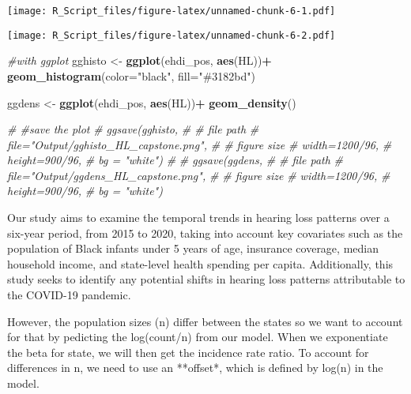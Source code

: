 \documentclass[
]{article}
\newenvironment{Shaded}{\begin{snugshade}}{\end{snugshade}}
\newcommand{\AttributeTok}[1]{\textcolor[rgb]{0.13,0.29,0.53}{#1}}
\newcommand{\CommentTok}[1]{\textcolor[rgb]{0.56,0.35,0.01}{\textit{#1}}}
\newcommand{\FunctionTok}[1]{\textcolor[rgb]{0.13,0.29,0.53}{\textbf{#1}}}
\newcommand{\NormalTok}[1]{#1}
\newcommand{\OtherTok}[1]{\textcolor[rgb]{0.56,0.35,0.01}{#1}}
\newcommand{\SpecialCharTok}[1]{\textcolor[rgb]{0.81,0.36,0.00}{\textbf{#1}}}
\newcommand{\StringTok}[1]{\textcolor[rgb]{0.31,0.60,0.02}{#1}}
\begin{document}
\texttt{[image: R\_Script\_files/figure-latex/unnamed-chunk-6-1.pdf]}

\begin{Shaded}
\end{Shaded}

\texttt{[image: R\_Script\_files/figure-latex/unnamed-chunk-6-2.pdf]}

\begin{Shaded}
\begin{Highlighting}[]
\CommentTok{\#with ggplot}
\NormalTok{gghisto }\OtherTok{\textless{}{-}} \FunctionTok{ggplot}\NormalTok{(ehdi\_pos, }\FunctionTok{aes}\NormalTok{(HL))}\SpecialCharTok{+}
    \FunctionTok{geom\_histogram}\NormalTok{(}\AttributeTok{color=}\StringTok{"black"}\NormalTok{, }\AttributeTok{fill=}\StringTok{"\#3182bd"}\NormalTok{)}

\NormalTok{ggdens }\OtherTok{\textless{}{-}} \FunctionTok{ggplot}\NormalTok{(ehdi\_pos, }\FunctionTok{aes}\NormalTok{(HL))}\SpecialCharTok{+}
    \FunctionTok{geom\_density}\NormalTok{()}

\CommentTok{\# \#save the plot}
\CommentTok{\# ggsave(gghisto,}
\CommentTok{\#        \# file path}
\CommentTok{\#        file="Output/gghisto\_HL\_capstone.png",}
\CommentTok{\#        \# figure size}
\CommentTok{\#        width=1200/96,}
\CommentTok{\#        height=900/96,}
\CommentTok{\#        bg = "white")}
\CommentTok{\# }
\CommentTok{\# ggsave(ggdens,}
\CommentTok{\#        \# file path}
\CommentTok{\#        file="Output/ggdens\_HL\_capstone.png",}
\CommentTok{\#        \# figure size}
\CommentTok{\#        width=1200/96,}
\CommentTok{\#        height=900/96,}
\CommentTok{\#        bg = "white")}
\end{Highlighting}
\end{Shaded}

Our study aims to examine the temporal trends in hearing loss patterns
over a six-year period, from 2015 to 2020, taking into account key
covariates such as the population of Black infants under 5 years of age,
insurance coverage, median household income, and state-level health
spending per capita. Additionally, this study seeks to identify any
potential shifts in hearing loss patterns attributable to the COVID-19
pandemic.

However, the population sizes (n) differ between the states so we want
to account for that by pedicting the log(count/n) from our model. When
we exponentiate the beta for state, we will then get the incidence rate
ratio. To account for differences in n, we need to use an **offset*,
which is defined by log(n) in the model.
\end{document}
